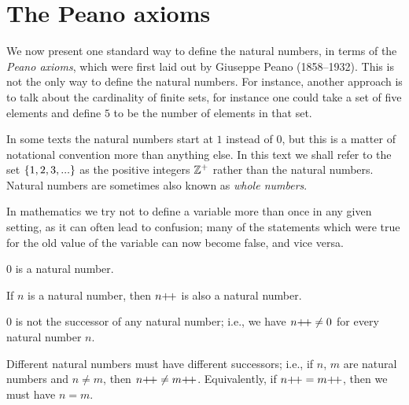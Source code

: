 \section{The Peano axioms}\label{i:sec:2.1}

\begin{note}
  We now present one standard way to define the natural numbers, in terms of the \emph{Peano axioms}, which were first laid out by Giuseppe Peano (1858--1932).
  This is not the only way to define the natural numbers.
  For instance, another approach is to talk about the cardinality of finite sets, for instance one could take a set of five elements and define \(5\) to be the number of elements in that set.
\end{note}

\begin{note}
  In some texts the natural numbers start at \(1\) instead of \(0\), but this is a matter of notational convention more than anything else.
  In this text we shall refer to the set \(\left\lbrace1, 2, 3,...\right\rbrace\) as the positive integers \(\mathbb{Z}^+\) rather than the natural numbers.
  Natural numbers are sometimes also known as \emph{whole numbers}.
\end{note}

\begin{note}
  In mathematics we try not to define a variable more than once in any given setting, as it can often lead to confusion;
  many of the statements which were true for the old value of the variable can now become false, and vice versa.
\end{note}

\begin{ax}\label{i:2.1}
  \(0\) is a natural number.
\end{ax}

\begin{ax}\label{i:2.2}
  If \(n\) is a natural number, then \(n{+}\!{+}\) is also a natural number.
\end{ax}

\begin{ax}\label{i:2.3}
  \(0\) is not the successor of any natural number;
  i.e., we have \(n{+}\!{+} \neq 0\) for every natural number \(n\).
\end{ax}

\begin{ax}\label{i:2.4}
  Different natural numbers must have different successors;
  i.e., if \(n\), \(m\) are natural numbers and \(n \neq m\), then \(n{+}\!{+} \neq m{+}\!{+}\).
  Equivalently, if \(n{+}\!{+} = m{+}\!{+}\), then we must have \(n = m\).
\end{ax}

